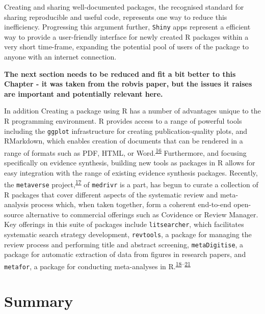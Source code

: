 \documentclass[a4paper, twoside]{templates/ociamthesis}
\begin{document}
Creating and sharing well-documented packages, the recognised standard for sharing reproducible and useful code, represents one way to reduce this inefficiency.
Progressing this argument further, \texttt{Shiny} apps represent a efficient way to provide a user-friendly interface for newly created R packages within a very short time-frame, expanding the potential pool of users of the package to anyone with an internet connection.

\colorbox[HTML]{CCCCFF}{\textbf{The next section needs to be reduced and fit a bit better to this Chapter - it was taken from the robvis paper, but the issues it raises are important and potentially relevant here.}}

In addition
Creating a package using R has a number of advantages unique to the R programming environment. R provides access to a range of powerful tools including the \texttt{ggplot} infrastructure for creating publication-quality plots, and RMarkdown, which enables creation of documents that can be rendered in a range of formats such as PDF, HTML, or Word.\textsuperscript{\protect\hyperlink{ref-xie2018r}{16}} Furthermore, and focusing specifically on evidence synthesis, building new tools as packages in R allows for easy integration with the range of existing evidence synthesis packages. Recently, the \texttt{metaverse} project,\textsuperscript{\protect\hyperlink{ref-variousauthors2020}{17}} of \texttt{medrivr} is a part, has begun to curate a collection of R packages that cover different aspects of the systematic review and meta-analysis process which, when taken together, form a coherent end-to-end open-source alternative to commercial offerings such as Covidence or Review Manager. Key offerings in this suite of packages include \texttt{litsearcher}, which facilitates systematic search strategy development, \texttt{revtools}, a package for managing the review process and performing title and abstract screening, \texttt{metaDigitise}, a package for automatic extraction of data from figures in research papers, and \texttt{metafor}, a package for conducting meta-analyses in R.\textsuperscript{\protect\hyperlink{ref-grames2019automated}{18}--\protect\hyperlink{ref-westgate2019revtools}{21}}

\hypertarget{summary-2}{%
\section{Summary}\label{summary-2}}
\end{document}
